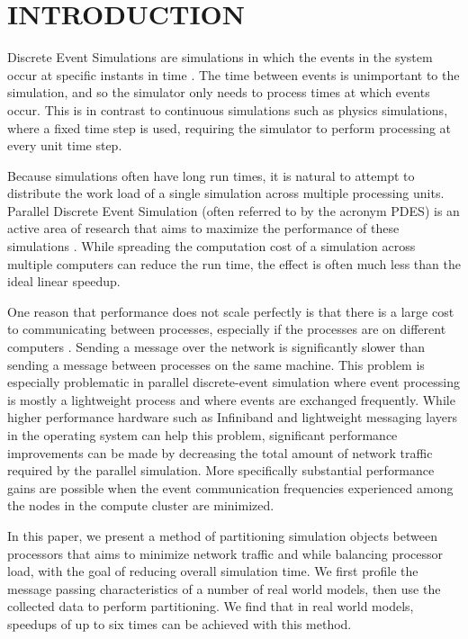 \documentclass{wscpaperproc}
\begin{document}
\section{INTRODUCTION}\label{sec:intro}

Discrete Event Simulations are simulations in which the events in the system occur at specific instants in time \cite{law-00,fujimoto-90}. The time between events is unimportant to the simulation, and so the simulator only needs to process times at which events occur. This is in contrast to continuous simulations such as physics simulations, where a fixed time step is used, requiring the simulator to perform processing at every unit time step.

Because simulations often have long run times, it is natural to attempt to distribute the work load of a single simulation across multiple processing units. Parallel Discrete Event Simulation (often referred to by the acronym PDES) is an active area of research that aims to maximize the performance of these simulations \cite{fujimoto-90}. While spreading the computation cost of a simulation across multiple computers can reduce the run time, the effect is often much less than the ideal linear speedup.

One reason that performance does not scale perfectly is that there is a large cost to communicating between processes, especially if the processes are on different computers \cite{carothers-94}. Sending a message over the network is significantly slower than sending a message between processes on the same machine. This problem is especially problematic in parallel discrete-event simulation where event processing is mostly a lightweight process and where events are exchanged frequently. While higher performance hardware such as Infiniband \cite{rashti-07} and lightweight messaging layers \cite{subramoni-09} in the operating system can help this problem, significant performance improvements can be made by decreasing the total amount of network traffic required by the parallel simulation. More specifically substantial performance gains are possible when the event communication frequencies experienced among the nodes in the compute cluster are minimized.

In this paper, we present a method of partitioning simulation objects between processors that aims to minimize network traffic and while balancing processor load, with the goal of reducing overall simulation time. We first profile the message passing characteristics of a number of real world models, then use the collected data to perform partitioning. We find that in real world models, speedups of up to six times can be achieved with this method.
\end{document}
